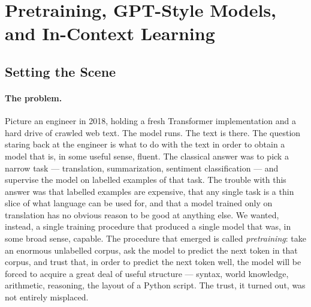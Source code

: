 \section{Pretraining, GPT-Style Models, and In-Context Learning}
\label{sec:week5-pretrain}

\subsection*{Setting the Scene}

\paragraph{The problem.}
Picture an engineer in 2018, holding a fresh Transformer
implementation and a hard drive of crawled web text. The model
runs. The text is there. The question staring back at the
engineer is what to do with the text in order to obtain a model
that is, in some useful sense, fluent. The classical answer was to pick a
narrow task --- translation, summarization, sentiment classification
--- and supervise the model on labelled examples of that task. The
trouble with this answer was that labelled examples are expensive,
that any single task is a thin slice of what language can be used
for, and that a model trained only on translation has no obvious
reason to be good at anything else. We wanted, instead, a single
training procedure that produced a single model that was, in some
broad sense, capable. The procedure that emerged is called
\emph{pretraining}: take an enormous unlabelled corpus, ask the
model to predict the next token in that corpus, and trust that, in
order to predict the next token well, the model will be forced to
acquire a great deal of useful structure --- syntax, world
knowledge, arithmetic, reasoning, the layout of a Python script.
The trust, it turned out, was not entirely misplaced.

